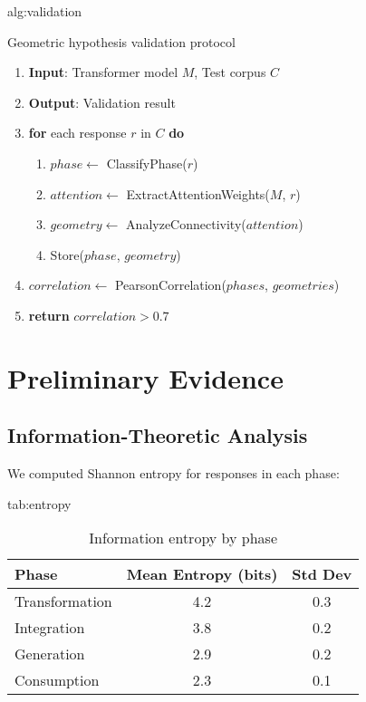 \documentclass[mlmain]{jmlr}
\begin{document}
\begin{algorithm}[htbp]
\floatconts
{alg:validation}
{\caption{Geometric hypothesis validation protocol}}
{
\begin{enumerate}
\item \textbf{Input}: Transformer model $M$, Test corpus $C$
\item \textbf{Output}: Validation result
\item \textbf{for} each response $r$ in $C$ \textbf{do}
\begin{enumerate}
\item $phase \leftarrow$ ClassifyPhase($r$)
\item $attention \leftarrow$ ExtractAttentionWeights($M$, $r$)
\item $geometry \leftarrow$ AnalyzeConnectivity($attention$)
\item Store($phase$, $geometry$)
\end{enumerate}
\item $correlation \leftarrow$ PearsonCorrelation($phases$, $geometries$)
\item \textbf{return} $correlation > 0.7$
\end{enumerate}
}
\end{algorithm}

\section{Preliminary Evidence}

\subsection{Information-Theoretic Analysis}

We computed Shannon entropy for responses in each phase:

\begin{table}[htbp]
\floatconts
  {tab:entropy}
  {\caption{Information entropy by phase}}
  {\begin{tabular}{lcc}
  \toprule
  Phase & Mean Entropy (bits) & Std Dev \\
  \midrule
  Transformation & 4.2 & 0.3 \\
  Integration & 3.8 & 0.2 \\
  Generation & 2.9 & 0.2 \\
  Consumption & 2.3 & 0.1 \\
  \bottomrule
  \end{tabular}}
\end{table}
\end{document}
